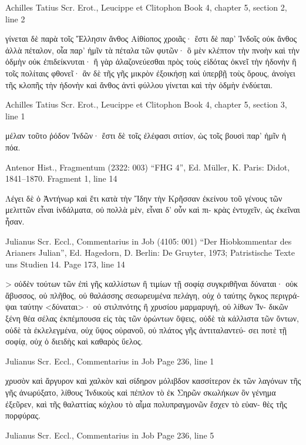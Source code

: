 \documentclass[12pt,letterpaper,twoside,final]{memoir}
\begin{document}
\begin{greek}
Achilles Tatius Scr. Erot., Leucippe et Clitophon 
Book 4, chapter 5, section 2, line 2

   γίνεται δὲ παρὰ τοῖς 
Ἕλλησιν ἄνθος Αἰθίοπος χροιᾶς· ἔστι δὲ παρ' Ἰνδοῖς οὐκ ἄνθος 
ἀλλὰ πέταλον, οἷα παρ' ἡμῖν τὰ πέταλα τῶν φυτῶν· ὃ μὲν κλέπτον 
τὴν πνοὴν καὶ τὴν ὀδμὴν οὐκ ἐπιδείκνυται· ἢ γὰρ ἀλαζονεύεσθαι 
πρὸς τοὺς εἰδότας ὀκνεῖ τὴν ἡδονὴν ἢ τοῖς πολίταις φθονεῖ· ἂν δὲ 
τῆς γῆς μικρὸν ἐξοικήσῃ καὶ ὑπερβῇ τοὺς ὅρους, ἀνοίγει τῆς κλοπῆς 
τὴν ἡδονὴν καὶ ἄνθος ἀντὶ φύλλου γίνεται καὶ τὴν ὀδμὴν ἐνδύεται. 



Achilles Tatius Scr. Erot., Leucippe et Clitophon 
Book 4, chapter 5, section 3, line 1

μέλαν τοῦτο ῥόδον Ἰνδῶν· ἔστι δὲ τοῖς ἐλέφασι σιτίον, ὡς τοῖς 
βουσὶ παρ' ἡμῖν ἡ πόα. 



Antenor Hist., Fragmentum (2322: 003)
“FHG 4”, Ed. Müller, K.
Paris: Didot, 1841–1870.
Fragment 1, line 14

                Λέγει δὲ ὁ Ἀντήνωρ καὶ ἔτι κατὰ τὴν 
Ἴδην τὴν Κρῆσσαν ἐκείνου τοῦ γένους τῶν μελιττῶν 
εἶναι ἰνδάλματα, οὐ πολλὰ μὲν, εἶναι δ' οὖν καὶ πι-
κρὰς ἐντυχεῖν, ὡς ἐκεῖναι ἦσαν. 



Julianus Scr. Eccl., Commentarius in Job (4105: 001)
“Der Hiobkommentar des Arianers Julian”, Ed. Hagedorn, D.
Berlin: De Gruyter, 1973; Patristische Texte uns Studien 14.
Page 173, line 14

                  > 
 οὐδὲν τούτων τῶν ἐπὶ γῆς καλλίστων ἢ τιμίων τῇ σοφίᾳ συγκριθῆναι δύναται· 
οὐκ ἄβυσσος, {οὐ πλῆθος,} οὐ θαλάσσης σεσωρευμένα πελάγη, οὐχ ὁ ταύτης ὄγκος 
περιγράψαι ταύτην <δύναται>· οὐ στιλπνότης ἢ χρυσίου μαρμαρυγή, οὐ λίθων Ἰν-
δικῶν ξένη θέα σέλας ἐκπέμπουσα εἰς τὰς τῶν ὁρώντων ὄψεις, οὐδὲ τὰ κάλλιστα 
τῶν ὄντων, οὐδὲ τὰ ἐκλελεγμένα, οὐχ ὕψος οὐρανοῦ, οὐ πλάτος γῆς ἀντιταλαντεύ-
σει ποτὲ τῇ σοφίᾳ, οὐχ ὁ διειδὴς καὶ καθαρὸς ὕελος. 



Julianus Scr. Eccl., Commentarius in Job 
Page 236, line 1

       χρυσὸν καὶ ἄργυρον καὶ χαλκὸν καὶ σίδηρον μόλιβδον κασσίτερον ἐκ τῶν   
λαγόνων τῆς γῆς ἀνωρύξατο, λίθους Ἰνδικοὺς καὶ πέπλον τὸ ἐκ Σηρῶν σκωλήκων ὂν 
γένημα ἐξεῦρεν, καὶ τῆς θαλαττίας κόχλου τὸ αἷμα πολυπραγμονῶν ἔσχεν τὸ εὐαν-
θὲς τῆς πορφύρας. 



Julianus Scr. Eccl., Commentarius in Job 
Page 236, line 5


\end{greek}
\end{document}
